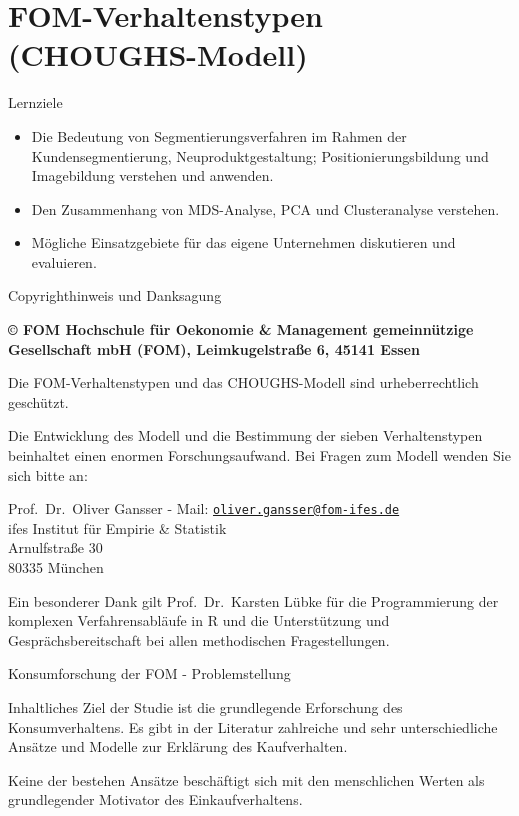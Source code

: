 \documentclass[12pt,ngerman,a4paper,ignorenonframetext,]{beamer}
\providecommand{\tightlist}{%
  \setlength{\itemsep}{0pt}\setlength{\parskip}{0pt}}
\begin{document}
\hypertarget{fom-verhaltenstypen-choughs-modell}{%
\section{FOM-Verhaltenstypen
(CHOUGHS-Modell)}\label{fom-verhaltenstypen-choughs-modell}}

\begin{frame}{Lernziele}
\protect\hypertarget{lernziele-7}{}

\begin{itemize}
\tightlist
\item
  Die Bedeutung von Segmentierungsverfahren im Rahmen der
  Kundensegmentierung, Neuproduktgestaltung; Positionierungsbildung und
  Imagebildung verstehen und anwenden.
\item
  Den Zusammenhang von MDS-Analyse, PCA und Clusteranalyse verstehen.
\item
  Mögliche Einsatzgebiete für das eigene Unternehmen diskutieren und
  evaluieren.
\end{itemize}

\end{frame}

\begin{frame}{Copyrighthinweis und Danksagung}
\protect\hypertarget{copyrighthinweis-und-danksagung}{}

\textbf{© FOM Hochschule für Oekonomie \& Management gemeinnützige
Gesellschaft mbH (FOM), Leimkugelstraße 6, 45141 Essen}

Die FOM-Verhaltenstypen und das CHOUGHS-Modell sind urheberrechtlich
geschützt.

Die Entwicklung des Modell und die Bestimmung der sieben Verhaltenstypen
beinhaltet einen enormen Forschungsaufwand. Bei Fragen zum Modell wenden
Sie sich bitte an:

Prof.~Dr.~Oliver Gansser - Mail:
\href{mailto:oliver.gansser@fom-ifes.de}{\nolinkurl{oliver.gansser@fom-ifes.de}}\\
ifes Institut für Empirie \& Statistik\\
Arnulfstraße 30\\
80335 München

Ein besonderer Dank gilt Prof.~Dr.~Karsten Lübke für die Programmierung
der komplexen Verfahrensabläufe in R und die Unterstützung und
Gesprächsbereitschaft bei allen methodischen Fragestellungen.

\end{frame}

\begin{frame}{Konsumforschung der FOM - Problemstellung}
\protect\hypertarget{konsumforschung-der-fom---problemstellung}{}

Inhaltliches Ziel der Studie ist die grundlegende Erforschung des
Konsumverhaltens. Es gibt in der Literatur zahlreiche und sehr
unterschiedliche Ansätze und Modelle zur Erklärung des Kaufverhalten.

Keine der bestehen Ansätze beschäftigt sich mit den menschlichen Werten
als grundlegender Motivator des Einkaufverhaltens.

\end{frame}
\end{document}
